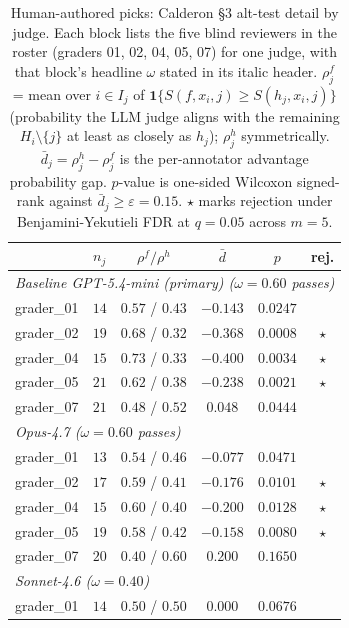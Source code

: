\begin{table}[p]
\centering\footnotesize
\caption{Human-authored picks: Calderon \S3 alt-test detail by judge. Each block lists the five blind reviewers in the roster (graders 01, 02, 04, 05, 07) for one judge, with that block's headline $\omega$ stated in its italic header. $\rho^f_j$ = mean over $i \in I_j$ of $\mathbf{1}\{S(f,x_i,j) \geq S(h_j,x_i,j)\}$ (probability the LLM judge aligns with the remaining $H_i\setminus\{j\}$ at least as closely as $h_j$); $\rho^h_j$ symmetrically. $\bar{d}_j = \rho^h_j - \rho^f_j$ is the per-annotator advantage probability gap. $p$-value is one-sided Wilcoxon signed-rank against $\bar{d}_j \geq \varepsilon = 0.15$. $\star$ marks rejection under Benjamini-Yekutieli FDR at $q=0.05$ across $m=5$.}
\label{tbl-calderon-per-annotator-human}
\setlength{\tabcolsep}{4pt}
\begin{tabular*}{\textwidth}{@{\extracolsep{\fill}}lccccc@{}}
\toprule
 & $n_j$ & $\rho^f / \rho^h$ & $\bar{d}$ & $p$ & rej. \\
\midrule
\multicolumn{6}{l}{\textit{Baseline GPT-5.4-mini (primary) ($\omega=0.60$ passes)}} \\
\quad grader\_01 & $14$ & $0.57$ / $0.43$ & $-0.143$ & $0.0247$ &  \\
\quad grader\_02 & $19$ & $0.68$ / $0.32$ & $-0.368$ & $0.0008$ & $\star$ \\
\quad grader\_04 & $15$ & $0.73$ / $0.33$ & $-0.400$ & $0.0034$ & $\star$ \\
\quad grader\_05 & $21$ & $0.62$ / $0.38$ & $-0.238$ & $0.0021$ & $\star$ \\
\quad grader\_07 & $21$ & $0.48$ / $0.52$ & $0.048$ & $0.0444$ &  \\
\multicolumn{6}{l}{\textit{Opus-4.7 ($\omega=0.60$ passes)}} \\
\quad grader\_01 & $13$ & $0.54$ / $0.46$ & $-0.077$ & $0.0471$ &  \\
\quad grader\_02 & $17$ & $0.59$ / $0.41$ & $-0.176$ & $0.0101$ & $\star$ \\
\quad grader\_04 & $15$ & $0.60$ / $0.40$ & $-0.200$ & $0.0128$ & $\star$ \\
\quad grader\_05 & $19$ & $0.58$ / $0.42$ & $-0.158$ & $0.0080$ & $\star$ \\
\quad grader\_07 & $20$ & $0.40$ / $0.60$ & $0.200$ & $0.1650$ &  \\
\multicolumn{6}{l}{\textit{Sonnet-4.6 ($\omega=0.40$)}} \\
\quad grader\_01 & $14$ & $0.50$ / $0.50$ & $0.000$ & $0.0676$ &  \\

\end{tabular*}
\end{table}
